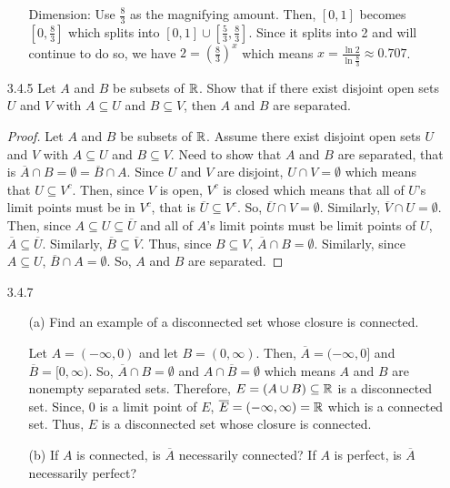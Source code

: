 \documentclass[12pt,letterpaper]{article}
\begin{document}
\begin{itemize}[leftmargin=!,labelindent=5pt]
\begin{itemize}
                    Dimension: Use $\frac{8}{3}$ as the magnifying amount.
                    Then, $[0,1]$ becomes $[0,\frac{8}{3}]$ which splits into $[0,1]\cup [\frac{5}{3}, \frac{8}{3}]$.
                    Since it splits into 2 and will continue to do so, we have $2 = (\frac{8}{3})^x$ which means $x = \frac{\ln 2}{\ln \frac{8}{3}} \approx 0.707$.
            \end{itemize}
        \item [3.4.5] Let $A$ and $B$ be subsets of $\mathbb{R}$. Show that if there exist disjoint open sets $U$ and $V$ with $A \subseteq U$ and $B \subseteq V$, then $A$ and $B$ are separated.
            \begin{proof}
                Let $A$ and $B$ be subsets of $\mathbb{R}$.
                Assume there exist disjoint open sets $U$ and $V$ with $A \subseteq U$ and $B \subseteq V$.
                Need to show that $A$ and $B$ are separated, that is $\overline{A} \cap B = \emptyset = \overline{B} \cap A$.
                Since $U$ and $V$ are disjoint, $U \cap V = \emptyset$ which means that $U \subseteq V^c$.
                Then, since $V$ is open, $V^c$ is closed which means that all of $U$'s limit points must be in $V^c$, that is $\overline{U} \subseteq V^c$.
                So, $\overline{U} \cap V = \emptyset$.
                Similarly, $\overline{V} \cap U = \emptyset$.
                Then, since $A \subseteq U \subseteq \overline{U}$ and all of $A$'s limit points must be limit points of $U$, $\overline{A} \subseteq \overline{U}$.
                Similarly, $\overline{B} \subseteq \overline{V}$.
                Thus, since $B \subseteq V$, $\overline{A} \cap B = \emptyset$.
                Similarly, since $A \subseteq U$, $\overline{B} \cap A = \emptyset$.
                So, $A$ and $B$ are separated.
            \end{proof}
        \item [3.4.7]
            \begin{itemize}
                \item [(a)] Find an example of a disconnected set whose closure is connected.
                
                    Let $A = (-\infty, 0)$ and let $B = (0, \infty)$.
                    Then, $\overline{A} = (-\infty, 0]$ and $\overline{B} = [0, \infty)$.
                    So, $\overline{A} \cap B = \emptyset$ and $A \cap \overline{B} = \emptyset$ which means $A$ and $B$ are nonempty separated sets.
                    Therefore, $E = (A \cup B) \subseteq \mathbb{R}$ is a disconnected set.
                    Since, $0$ is a limit point of $E$, $\overline{E} = (-\infty, \infty) = \mathbb{R}$ which is a connected set.
                    Thus, $E$ is a disconnected set whose closure is connected.
                \item [(b)] If $A$ is connected, is $\overline{A}$ necessarily connected? If $A$ is perfect, is $\overline{A}$ necessarily perfect?
                

\end{itemize}
\end{itemize}
\end{document}
